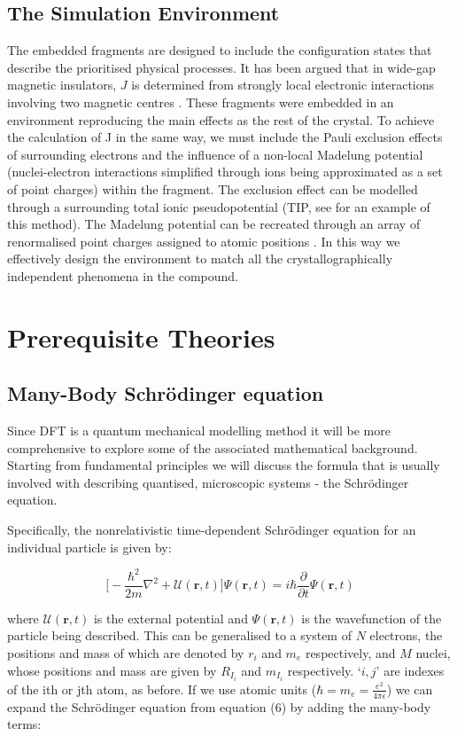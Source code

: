 \documentclass[10pt]{article}
\begin{document}
\subsection{The Simulation Environment}
The embedded fragments are designed to include the configuration states that describe the prioritised physical processes. It has been argued that in wide-gap magnetic insulators, $J$ is determined from strongly local electronic interactions involving two magnetic centres \cite{de1999local}. These fragments were embedded in an environment reproducing the main effects as the rest of the crystal. To achieve the calculation of J in the same way, we must include the Pauli exclusion effects of surrounding electrons and the influence of a non-local Madelung potential (nuclei-electron interactions simplified through ions being approximated as a set of point charges) within the fragment. The exclusion effect can be modelled through a surrounding total ionic pseudopotential (TIP, see \cite{winter1987theoretical} for an example of this method). The Madelung potential can be recreated through an array of renormalised point charges assigned to atomic positions \cite{gelle2008fast}. In this way we effectively design the environment to match all the crystallographically independent phenomena in the compound.

\section{Prerequisite Theories}
\subsection{Many-Body Schrödinger equation}
Since DFT is a quantum mechanical modelling method it will be more comprehensive to explore some of the associated mathematical background. Starting from fundamental principles we will discuss the formula that is usually involved with describing quantised, microscopic systems - the Schrödinger equation.

Specifically, the nonrelativistic time-dependent Schrödinger equation for an individual particle is given by:

\begin{equation}
	\biggr[-\frac{\hbar^2}{2m}\nabla^2+\mathcal{U}(\textbf{r},t)\biggr]\Psi(\textbf{r},t) = i\hbar\frac{\partial}{\partial t}\Psi(\textbf{r},t)
\end{equation}

where $\mathcal{U}(\textbf{r},t)$ is the external potential and $\Psi(\textbf{r},t)$ is the wavefunction of the particle being described. This can be generalised to a system of $N$ electrons, the positions and mass of which are denoted by \textbf{$r_i$} and $m_e$ respectively, and $M$ nuclei, whose positions and mass are given by \textbf{$R_{I_i}$} and $m_{I_i}$ respectively. `$i,j$' are indexes of the ith or jth atom, as before. If we use atomic units ($\hbar = m_e = \frac{e^2}{4\pi\epsilon}$) we can expand the Schrödinger equation from equation (6) by adding the many-body terms:
\end{document}
